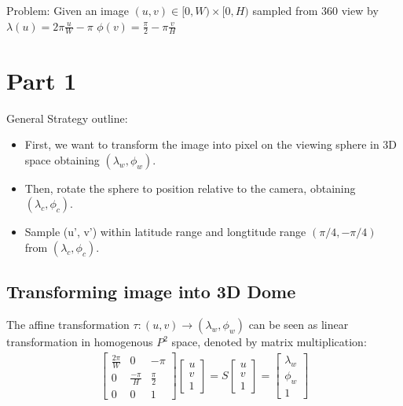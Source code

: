 \documentclass{article}
\begin{document}
Problem: 
Given an image
$(u, v) \in [0, W) \times [0, H)$  
sampled from $360$ view by 
$\lambda(u) = 2\pi \frac{u}{W} - \pi $
$\phi(v) = \frac{\pi}{2} - \pi\frac{v}{H} $

\section{Part 1}
General Strategy outline: 
\begin{itemize}
    \item First, we want to transform the image into pixel on the viewing sphere in 3D space obtaining $(\lambda_w, \phi_w)$. 
    \item Then, rotate the sphere to position relative to the camera, obtaining $(\lambda_c, \phi_c)$. 
    \item Sample (u', v') within latitude range and longtitude range $(\pi / 4, -\pi / 4)$ from $(\lambda_c, \phi_c)$.
\end{itemize}

\subsection{Transforming image into 3D Dome}
The affine transformation $\tau : (u, v) \rightarrow (\lambda_w, \phi_w)$ can be seen as linear transformation in homogenous $P^2$ space, 
denoted by matrix multiplication: 
\begin{align*}
    \begin{bmatrix}
    \frac{2\pi}{W} & 0 & -\pi \\
    0 & \frac{-\pi}{H} & \frac{\pi}{2} \\
    0 & 0 & 1
    \end{bmatrix}
    \begin{bmatrix}
        u \\ v \\ 1
    \end{bmatrix}
    = S \begin{bmatrix}
        u \\ v \\ 1
    \end{bmatrix} = 
    \begin{bmatrix}
        \lambda_w \\ \phi_w \\ 1
    \end{bmatrix} 
\end{align*}
\end{document}
